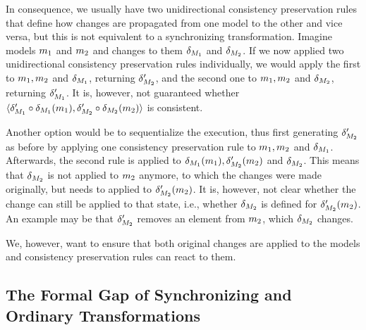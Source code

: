 In consequence, we usually have two unidirectional consistency preservation rules that define how changes are propagated from one model to the other and vice versa, but this is not equivalent to a synchronizing transformation.
Imagine models $m_{1}$ and $m_{2}$ and changes to them $\delta_{M_{1}}$ and $\delta_{M_{2}}$.
If we now applied two unidirectional consistency preservation rules individually, we would apply the first to $m_{1},m_{2}$ and $\delta_{M_{1}}$, returning $\delta_{M_{2}}'$, and the second one to $m_{1},m_{2}$ and $\delta_{M_{2}}$, returning $\delta_{M_{1}}'$.
It is, however, not guaranteed whether $\langle \delta_{M_{1}}' \circ \delta_{M_{1}}(m_{1}), \delta_{M_{2}}' \circ \delta_{M_{2}}(m_{2}) \rangle$ is consistent.

Another option would be to sequentialize the execution, thus first generating $\delta_{M_{2}}'$ as before by applying one consistency preservation rule to $m_{1},m_{2}$ and $\delta_{M_{1}}$.
Afterwards, the second rule is applied to $\delta_{M_{1}}(m_{1}),\delta_{M_{2}}'(m_{2})$ and $\delta_{M_{2}}$.
This means that $\delta_{M_{2}}$ is not applied to $m_{2}$ anymore, to which the changes were made originally, but needs to applied to $\delta_{M_{2}}'(m_{2})$.
It is, however, not clear whether the change can still be applied to that state, i.e., whether $\delta_{M_{2}}$ is defined for $\delta_{M_{2}}'(m_{2})$.
An example may be that $\delta_{M_{2}}'$ removes an element from $m_{2}$, which $\delta_{M_{2}}$ changes.

We, however, want to ensure that both original changes are applied to the models and consistency preservation rules can react to them.



\subsection{The Formal Gap of Synchronizing and Ordinary Transformations}

